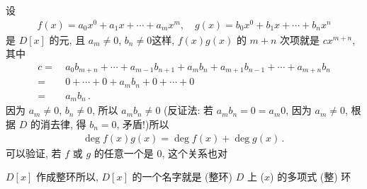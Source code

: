 \begin{remark}
    设
    \begin{align*}
        f(x) = a_0 x^0 + a_1 x + \cdots + a_m x^m, \quad g(x) = b_0 x^0 + b_1 x + \cdots + b_n x^n
    \end{align*}
    是 $D[x]$ 的元, 且 $a_m \neq 0$, $b_n \neq 0$\period 这样, $f(x)g(x)$ 的 $m+n$ 次项就是 $cx^{m+n}$, 其中
    \begin{align*}
        c
        = \  & a_0 b_{m+n} + \cdots + a_{m-1} b_{n+1} + a_m b_n + a_{m+1} b_{n-1} + \cdots + a_{m+n}b_n \\
        = \  & 0 + \cdots + 0 + a_m b_n + 0 + \cdots + 0                                                \\
        = \  & a_m b_n \period
    \end{align*}
    因为 $a_m \neq 0$, $b_n \neq 0$, 所以 $a_m b_n \neq 0$ (反证法: 若 $a_m b_n = 0 = a_m 0$, 因为 $a_m \neq 0$, 根据 $D$ 的消去律, 得 $b_n = 0$, 矛盾!)\period 所以
    \begin{align*}
        \deg f(x) g(x) = \deg f(x) + \deg g(x) \period
    \end{align*}
    可以验证, 若 $f$ 或 $g$ 的任意一个是 $0$, 这个关系也对\period
\end{remark}

\begin{proposition}
    $D[x]$ 作成整环\period 所以, $D[x]$ 的一个名字就是 (整环) $D$ 上 ($x$) 的多项式 (整) 环\period
\end{proposition}


